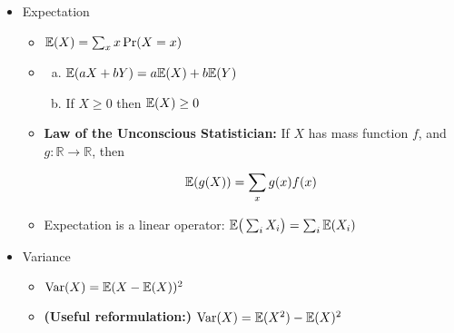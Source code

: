 \begin{itemize}

\item Expectation

\begin{itemize}

\item \begin{definition} \(\E(X) = \sum_x x \Pr(X = x)\) \end{definition}

\item \begin{theorem} 

\begin{enumerate}[(a)]

\item \(\E(aX + bY) = a \E(X) + b \E(Y)\) 

\item If \(X \geq 0\) then \(\E(X) \geq 0\)

\end{enumerate}
\end{theorem}

\item \begin{theorem} \label{prob.law.of.uncon} \textbf{Law of the Unconscious Statistician:} If \(X\) has mass function \(f\), and \(g: \mathbb{R} \to \mathbb{R}\), then 

\[
\E(g(X)) = \sum_x g(x) f(x)
\] \end{theorem}

\item \begin{proposition}Expectation is a linear operator: \( \E \big(\sum_i X_i \big) = \sum_i \E(X_i)\) \end{proposition}



\end{itemize}

\item Variance

\begin{itemize}

\item \begin{definition} \( \Var(X) = \E(X - \E(X))^2\) \end{definition}

\item \begin{proposition} \textbf{(Useful reformulation:)} \(\Var(X) = \E(X^2) - \E(X)^2\) \end{proposition}


\end{itemize}
\end{itemize}
